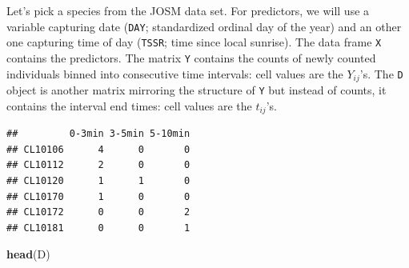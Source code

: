 \documentclass[12pt,]{book}
\newenvironment{Shaded}{\begin{snugshade}}{\end{snugshade}}
\newcommand{\DataTypeTok}[1]{\textcolor[rgb]{0.13,0.29,0.53}{#1}}
\newcommand{\DecValTok}[1]{\textcolor[rgb]{0.00,0.00,0.81}{#1}}
\newcommand{\KeywordTok}[1]{\textcolor[rgb]{0.13,0.29,0.53}{\textbf{#1}}}
\newcommand{\NormalTok}[1]{#1}
\newcommand{\OperatorTok}[1]{\textcolor[rgb]{0.81,0.36,0.00}{\textbf{#1}}}
\newcommand{\OtherTok}[1]{\textcolor[rgb]{0.56,0.35,0.01}{#1}}
\newcommand{\StringTok}[1]{\textcolor[rgb]{0.31,0.60,0.02}{#1}}
\begin{document}
Let's pick a species from the JOSM data set.
For predictors, we will use a variable capturing date (\texttt{DAY}; standardized ordinal day of the year)
and an other one capturing time of day (\texttt{TSSR}; time since local sunrise).
The data frame \texttt{X} contains the predictors.
The matrix \texttt{Y} contains the counts of newly counted individuals binned into consecutive time intervals:
cell values are the \(Y_{ij}\)'s. The \texttt{D} object is another matrix mirroring the structure of \texttt{Y}
but instead of counts, it contains the interval end times: cell values are
the \(t_{ij}\)'s.

\begin{Shaded}
\end{Shaded}

\begin{verbatim}
##         0-3min 3-5min 5-10min
## CL10106      4      0       0
## CL10112      2      0       0
## CL10120      1      1       0
## CL10170      1      0       0
## CL10172      0      0       2
## CL10181      0      0       1
\end{verbatim}

\begin{Shaded}
\begin{Highlighting}[]
\KeywordTok{head}\NormalTok{(D)}
\end{Highlighting}
\end{Shaded}
\end{document}
